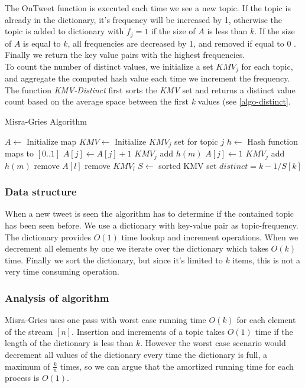 The OnTweet function is executed each time we see a new topic. If the topic is already in the dictionary, it's frequency will be increased by 1, otherwise the topic is added to dictionary with $f_{j}=1$ if the size of $A$ is less than $k$. If the size of $A$ is equal to $k$, all frequencies are decreased by 1, and removed if equal to 0 \cite{Amit}. Finally we return the key value pairs with the highest frequencies.
\\
To count the number of distinct values, we initialize a set $KMV_{j}$ for each topic, and aggregate the computed hash value each time we increment the frequency. The function \textit{KMV-Distinct} first sorts the \textit{KMV} set and returns a distinct value count based on the average space between the first \textit{k} values (see \ref{algo-distinct}.
\\ 
\begin{algorithm}
\caption{Misra-Gries Algorithm}\label{misra-pseudo}
\begin{algorithmic}[1]
\State $A\gets$ Initialize map
\State $KMV\gets$ Initialize $KMV_{j}$ set for topic $j$
\State $h\gets$ Hash function maps to $[0..1]$
\Statex
{}
    \State $A[j] \leftarrow A[j] + 1$
    \State $KMV_{j}$ add $h(m)$
    \State $A[j] \leftarrow 1$
    \State $KMV_{j}$ add $h(m)$
\Else
        \State remove $A[l]$
        \State remove $KMV_{l}$
        \EndIf
    \EndFor
\EndIf
\EndFunction
\Statex
{}
\State $S\gets$ sorted KMV set
\State $distinct = k-1/S[k]$
\EndFunction
\end{algorithmic}
\end{algorithm}

\subsubsection{Data structure}
When a new tweet is seen the algorithm has to determine if the contained topic has been seen before. We use a dictionary with key-value pair as topic-frequency. The dictionary provides $O(1)$ time lookup and increment operations. When we decrement all elements by one we iterate over the dictionary which takes $O(k)$ time. Finally we sort the dictionary, but since it's limited to $k$ items, this is not a very time consuming operation.

\subsubsection{Analysis of algorithm}\label{algo-analysis}
Misra-Gries uses one pass with worst case running time $O(k)$ for each element of the stream $[n]$. Insertion and increments of a topic takes $O(1)$ time if the length of the dictionary is less than $k$. However the worst case scenario would decrement all values of the dictionary every time the dictionary is full, a maximum of $\frac{k}{n}$ times, so we can argue that the amortized running time for each process is $O(1)$.


